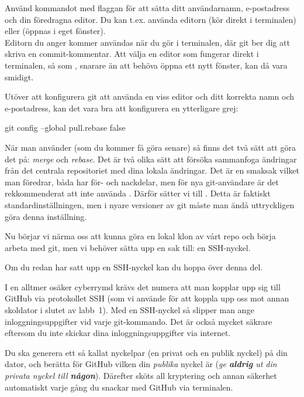\begin{Datorarbete}
	\code{[\ref{git-config}]} Använd kommandot  med flaggan  för att sätta ditt användarnamn, e-postadress och din föredragna editor. Du kan t.ex. använda editorn  (kör direkt i terminalen) eller  (öppnas i eget fönster).
	\\

	Editorn du anger kommer användas när du gör  i terminalen, där git ber dig att skriva en commit-kommentar. Att välja en editor som fungerar direkt i terminalen, så som , snarare än att behöva öppna ett nytt fönster, kan då vara smidigt.

	\item Utöver att konfigurera git att använda en viss editor och ditt korrekta namn och e-postadress, kan det vara bra att konfigurera en ytterligare grej:
	\begin{Code}
	git config --global pull.rebase false
	\end{Code}
	När man använder  (som du kommer få göra senare) så finns det två sätt att göra det på: \emph{merge} och \emph{rebase}. Det är två olika sätt att försöka sammanfoga ändringar från det centrala repositoriet med dina lokala ändringar. Det är en smaksak vilket man föredrar, båda har för- och nackdelar, men för nya git-användare är det rekkommenderat att inte använda . Därför sätter vi  till . Detta är faktiskt standardinställningen, men i nyare versioner av git måste man ändå uttryckligen göra denna inställning.

	\item Nu börjar vi närma oss att kunna göra en lokal klon av vårt repo och börja arbeta med git, men vi behöver sätta upp en sak till: en SSH-nyckel.
	
	\halfblankline
	Om du redan har satt upp en SSH-nyckel kan du hoppa över denna del.
	\halfblankline
	
	\noindent I en alltmer osäker cyberrymd krävs det numera att man kopplar upp sig till GitHub via protokollet SSH (som vi använde för att koppla upp oss mot annan skoldator i slutet av labb~1). Med en SSH-nyckel så slipper man ange inloggningsuppgifter vid varje git-kommando. Det är också mycket säkrare eftersom du inte skickar dina inloggningsuppgifter via internet.
	
	Du ska generera ett så kallat nyckelpar (en privat och en publik nyckel) på din dator, och berätta för GitHub vilken din \emph{publika} nyckel är (\emph{ge \textbf{aldrig} ut din privata nyckel till \textbf{någon}}). Därefter sköts all kryptering och annan säkerhet automatiskt varje gång du snackar med GitHub via terminalen.
	


\end{Datorarbete}
